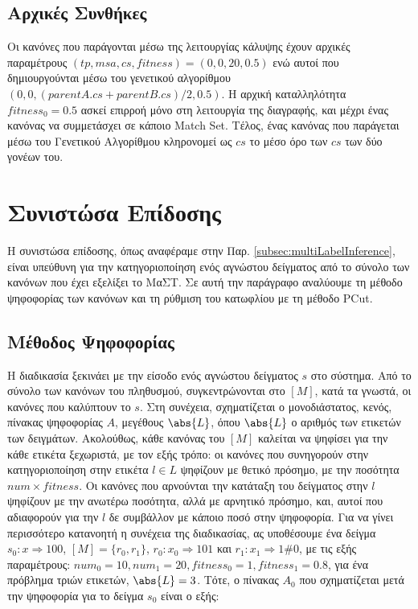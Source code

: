 \subsection{Αρχικές Συνθήκες}
Οι κανόνες που παράγονται μέσω της λειτουργίας κάλυψης έχουν αρχικές παραμέτρους $(tp, msa, cs, fitness) = (0,0,20,0.5)$ ενώ αυτοί που δημιουργούνται μέσω του γενετικού αλγορίθμου $(0,0,(parentA.cs+parentB.cs)/2, 0.5)$. Η αρχική καταλληλότητα $fitness_{0}=0.5$ ασκεί επιρροή μόνο στη λειτουργία της διαγραφής, και μέχρι ένας κανόνας να συμμετάσχει σε κάποιο Match Set. Τέλος, ένας κανόνας που παράγεται μέσω του Γενετικού Αλγορίθμου κληρονομεί ως $cs$ το μέσο όρο των $cs$ των δύο γονέων του.



\section{Συνιστώσα Επίδοσης}
\label{sec:multiLabelInference}
Η συνιστώσα επίδοσης, όπως αναφέραμε στην Παρ. \ref{subsec:multiLabelInference}, είναι υπεύθυνη για την κατηγοριοποίηση ενός αγνώστου δείγματος από το σύνολο των κανόνων που έχει εξελίξει το ΜαΣΤ. Σε αυτή την παράγραφο αναλύουμε τη μέθοδο ψηφοφορίας των κανόνων και τη ρύθμιση του κατωφλίου με τη μέθοδο PCut.

\subsection{Μέθοδος Ψηφοφορίας}
\label{subsec:multiLabelVoting}
Η διαδικασία ξεκινάει με την είσοδο ενός αγνώστου δείγματος $s$ στο σύστημα. Από το σύνολο των κανόνων του πληθυσμού, συγκεντρώνονται στο $[M]$, κατά τα γνωστά, οι κανόνες που καλύπτουν το $s$. Στη συνέχεια, σχηματίζεται ο μονοδιάστατος, κενός, πίνακας ψηφοφορίας $A$, μεγέθους $\abs{L}$, όπου $\abs{L}$ ο αριθμός των ετικετών των δειγμάτων. Ακολούθως, κάθε κανόνας του $[M]$ καλείται να ψηφίσει για την κάθε ετικέτα ξεχωριστά, με τον εξής τρόπο: οι κανόνες που συνηγορούν στην κατηγοριοποίηση στην ετικέτα $l \in L$ ψηφίζουν με θετικό πρόσημο, με την ποσότητα $num \times fitness$. Οι κανόνες που αρνούνται την κατάταξη του δείγματος στην $l$ ψηφίζουν με την ανωτέρω ποσότητα, αλλά με αρνητικό πρόσημο, και, αυτοί που αδιαφορούν για την $l$ δε συμβάλλον με κάποιο ποσό στην ψηφοφορία. Για να γίνει περισσότερο κατανοητή η συνέχεια της διαδικασίας, ας υποθέσουμε ένα δείγμα $s_{0}: x \Rightarrow 100$, $[M] = \{r_{0}, r_{1}\}
$,  $r_{0}: x_{0} \Rightarrow 101$ και $r_{1}: x_{1} \Rightarrow 1\#0$, με τις εξής παραμέτρους: $num_{0} = 10, num_{1} = 20, fitness_{0} = 1, fitness_{1} = 0.8$, για ένα πρόβλημα τριών ετικετών, $\abs{L}=3$. Τότε, ο πίνακας $A_{0}$ που σχηματίζεται μετά την ψηφοφορία για το δείγμα $s_{0}$ είναι ο εξής:


